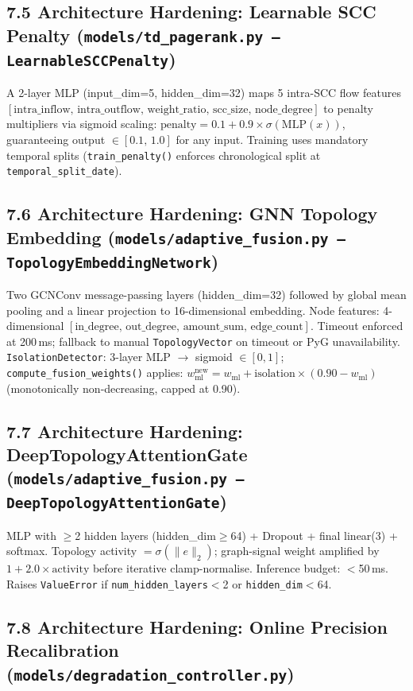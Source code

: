 \documentclass[12pt,a4paper]{article}
\begin{document}
\subsection{7.5 Architecture Hardening: Learnable SCC Penalty
          (\texttt{models/td\_pagerank.py --- LearnableSCCPenalty})}

A 2-layer MLP (input\_dim=5, hidden\_dim=32) maps 5 intra-SCC flow features
$[\text{intra\_inflow},\,\text{intra\_outflow},\,\text{weight\_ratio},\,\text{scc\_size},\,
\text{node\_degree}]$ to penalty multipliers via sigmoid scaling:
$\text{penalty} = 0.1 + 0.9\times\sigma(\text{MLP}(x))$, guaranteeing output $\in[0.1,\,1.0]$
for any input. Training uses mandatory temporal splits (\texttt{train\_penalty()} enforces
chronological split at \texttt{temporal\_split\_date}).

\subsection{7.6 Architecture Hardening: GNN Topology Embedding
          (\texttt{models/adaptive\_fusion.py --- TopologyEmbeddingNetwork})}

Two GCNConv message-passing layers (hidden\_dim=32) followed by global mean pooling
and a linear projection to 16-dimensional embedding. Node features: 4-dimensional
$[\text{in\_degree},\,\text{out\_degree},\,\text{amount\_sum},\,\text{edge\_count}]$.
Timeout enforced at 200\,ms; fallback to manual \texttt{TopologyVector} on timeout or PyG
unavailability. \texttt{IsolationDetector}: 3-layer MLP $\to$ sigmoid $\in[0,1]$;
\texttt{compute\_fusion\_weights()} applies:
$w_\text{ml}^\text{new} = w_\text{ml} + \text{isolation}\times(0.90 - w_\text{ml})$
(monotonically non-decreasing, capped at 0.90).

\subsection{7.7 Architecture Hardening: DeepTopologyAttentionGate
          (\texttt{models/adaptive\_fusion.py --- DeepTopologyAttentionGate})}

MLP with $\geq$2 hidden layers (hidden\_dim$\geq$64) + Dropout + final linear(3) + softmax.
Topology activity $= \sigma(\|e\|_2)$; graph-signal weight amplified by
$1 + 2.0\times\text{activity}$ before iterative clamp-normalise.
Inference budget: $<$50\,ms. Raises \texttt{ValueError} if \texttt{num\_hidden\_layers}$<$2
or \texttt{hidden\_dim}$<$64.

\subsection{7.8 Architecture Hardening: Online Precision Recalibration
          (\texttt{models/degradation\_controller.py})}
\end{document}

